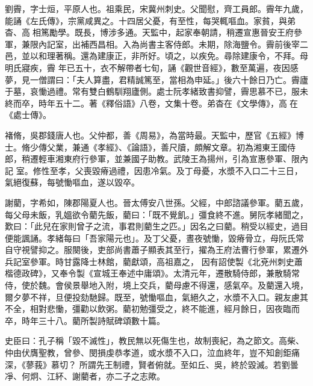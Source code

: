 \begin{pinyinscope}
 劉霽，字士烜，平原人也。祖乘民，宋冀州刺史。父聞慰，齊工員郎。霽年九歲，能誦《左氏傳》，宗黨咸異之。十四居父憂，有至性，每哭輒嘔血。家貧，與弟杳、高相篤勵學。既長，博涉多通。天監中，起家奉朝請，稍遷宣惠晉安王府參軍，兼限內記室，出補西昌相。入為尚書主客侍郎。未期，除海鹽令。霽前後宰二邑，並以和理著稱。還為建康正，非所好。頃之，以疾免。尋除建康令，不拜。母明氏寢疾，霽
 年已五十，衣不解帶者七旬，誦《觀世音經》，數至萬遍，夜因感夢，見一僧謂曰：「夫人算盡，君精誠篤至，當相為申延。」後六十餘日乃亡。霽廬于墓，哀慟過禮。常有雙白鶴馴翔廬側。處士阮孝緒致書抑譬，霽思慕不已，服未終而卒，時年五十二。著《釋俗語》八卷，文集十卷。弟杳在《文學傳》，高在《處士傳》。



 褚脩，吳郡錢唐人也。父仲都，善《周易》，為當時最。天監中，歷官《五經》博士。脩少傳父業，兼通《孝經》、《論語》，善尺牘，頗解文章。初為湘東王國侍郎，稍遷輕車湘東府行參軍，並兼國子助教。武陵王為揚州，引為宣惠參軍、限內記
 室。修性至孝，父喪毀瘠過禮，因患冷氣。及丁母憂，水漿不入口二十三日，氣絕復蘇，每號慟嘔血，遂以毀卒。



 謝藺，字希如，陳郡陽夏人也。晉太傅安八世孫。父經，中郎諮議參軍。藺五歲，每父母未飯，乳媼欲令藺先飯，藺曰：「既不覺飢。」彊食終不進。舅阮孝緒聞之，歎曰：「此兒在家則曾子之流，事君則藺生之匹。」因名之曰藺。稍受以經史，過目便能諷誦。孝緒每曰「吾家陽元也」。及丁父憂，晝夜號慟，毀瘠骨立，母阮氏常自守視譬抑之。服闋後，吏部尚書蕭子顯表其至行，擢為王府法曹行參軍，累遷外兵記室參軍。時甘露降士林館，藺獻頌，高祖嘉之，
 因有詔使製《北兗州刺史蕭楷德政碑》，又奉令製《宣城王奉述中庸頌》。太清元年，遷散騎侍郎，兼散騎常侍，使於魏。會侯景舉地入附，境上交兵，藺母慮不得還，感氣卒。及藺還入境，爾夕夢不祥，旦便投劾馳歸。既至，號慟嘔血，氣絕久之，水漿不入口。親友慮其不全，相對悲慟，彊勸以飲粥。藺初勉彊受之，終不能進，經月餘日，因夜臨而卒，時年三十八。藺所製詩賦碑頌數十篇。



 史臣曰：孔子稱「毀不滅性」，教民無以死傷生也，故制喪紀，為之節文。高柴、仲由伏膺聖教，曾參、閔損虔恭孝道，或水漿不入口，泣血終年，豈不知創鉅痛深，《蓼莪》慕切？
 所謂先王制禮，賢者俯就。至如丘、吳，終於毀滅。若劉曇凈、何炯、江紑、謝藺者，亦二子之志歟。



\end{pinyinscope}